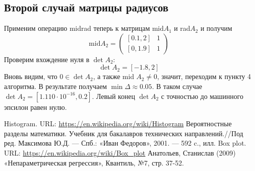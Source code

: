 \documentclass[a4paper,14pt]{article}
\begin{document}
	\subsection{Второй случай матрицы радиусов}
	Применим операцию midrad теперь к матрицам mid$A_1$ и rad$A_2$ и получим
	\begin{equation}
		\text{mid} A_2 = \begin{pmatrix}
			[0.1,2] & 1\\ 
			[0,1.9] & 1
		\end{pmatrix}
	\end{equation}
	Проверим вхождение нуля в $\det A_2$:
	\begin{equation}
		\det A_2 = [-1.8,2]
	\end{equation}
	Вновь видим, что $0 \in \det A_2$, а также mid $A_2 \neq 0$, значит, переходим к пункту 4 алгоритма.
	В результате получаем $\min \Delta \approx 0.05$. В таком случае $\det A_2 = [1.110 \cdot 10^{-16}, 0.2]$. Левый конец $\det A_2$ с
	точностью до машинного эпсилон равен нулю.
	\newpage
	
	\begin{thebibliography}{4}
		Histogram. URL: \url{https://en.wikipedia.org/wiki/Histogram}
		Вероятностные разделы математики. Учебник для бакалавров технических направлений.//Под ред. Максимова Ю.Д. --- Спб.: «Иван Федоров», 2001. --- 592 c., илл.
		Box plot. URL: \url{https://en.wikipedia.org/wiki/Box_plot}
		Анатольев, Станислав (2009) «Непараметрическая регрессия», Квантиль, №7, стр. 37-52.
	\end{thebibliography}
	
\end{document}
